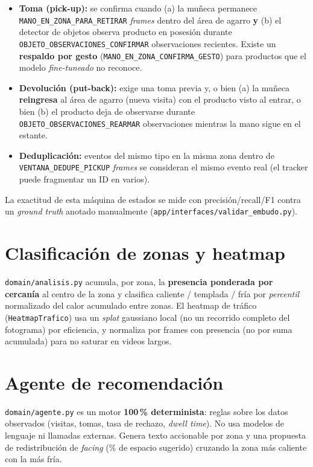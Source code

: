\documentclass[11pt,a4paper]{report}
\begin{document}
\begin{itemize}
  \item \textbf{Toma (pick-up):} se confirma cuando (a) la muñeca permanece
    \texttt{MANO\_EN\_ZONA\_PARA\_RETIRAR} \textit{frames} dentro del área de agarro \textbf{y}
    (b) el detector de objetos observa producto en posesión durante
    \texttt{OBJETO\_OBSERVACIONES\_CONFIRMAR} observaciones recientes. Existe un
    \textbf{respaldo por gesto} (\texttt{MANO\_EN\_ZONA\_CONFIRMA\_GESTO}) para productos que el
    modelo \textit{fine-tuneado} no reconoce.
  \item \textbf{Devolución (put-back):} exige una toma previa y, o bien (a) la muñeca
    \textbf{reingresa} al área de agarro (nueva visita) con el producto visto al entrar, o bien
    (b) el producto deja de observarse durante \texttt{OBJETO\_OBSERVACIONES\_REARMAR}
    observaciones mientras la mano sigue en el estante.
  \item \textbf{Deduplicación:} eventos del mismo tipo en la misma zona dentro de
    \texttt{VENTANA\_DEDUPE\_PICKUP} \textit{frames} se consideran el mismo evento real (el
    tracker puede fragmentar un ID en varios).
\end{itemize}

La exactitud de esta máquina de estados se mide con precisión/recall/F1 contra un
\textit{ground truth} anotado manualmente (\texttt{app/interfaces/validar\_embudo.py}).

\section{Clasificación de zonas y heatmap}

\texttt{domain/analisis.py} acumula, por zona, la \textbf{presencia ponderada por cercanía} al
centro de la zona y clasifica caliente / templada / fría por \textit{percentil} normalizado del
calor acumulado entre zonas. El heatmap de tráfico (\texttt{HeatmapTrafico}) usa un
\textit{splat} gaussiano local (no un recorrido completo del fotograma) por eficiencia, y
normaliza por frames con presencia (no por suma acumulada) para no saturar en videos largos.

\section{Agente de recomendación}

\texttt{domain/agente.py} es un motor \textbf{100\,\% determinista}: reglas sobre los datos
observados (visitas, tomas, tasa de rechazo, \textit{dwell time}). No usa modelos de lenguaje ni
llamadas externas. Genera texto accionable por zona y una propuesta de redistribución de
\textit{facing} (\% de espacio sugerido) cruzando la zona más caliente con la más fría.
\end{document}
